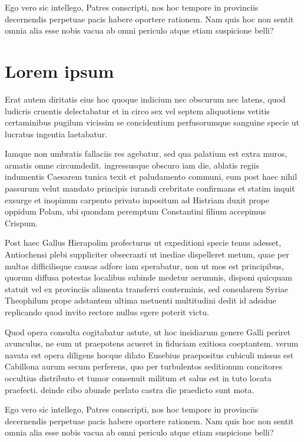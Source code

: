 ﻿\documentclass{SchoolReport}
\begin{document}
Ego vero sic intellego, Patres conscripti, nos hoc tempore in provinciis \citetext{{E}uropean {A}ssociation for {S}tandardizing {I}nformation and {C}ommunication {S}ystems ({ECMA}), \citeyear{ECMA-262-v6}} decernendis perpetuae pacis habere oportere rationem. Nam quis hoc non sentit omnia alia esse nobis vacua ab omni periculo atque etiam suspicione belli?


\appendix
\chapter{Lorem ipsum}
Erat autem diritatis eius hoc quoque indicium nec obscurum nec latens, quod ludicris cruentis delectabatur et in circo sex vel septem aliquotiens vetitis certaminibus pugilum vicissim se concidentium perfusorumque sanguine specie ut lucratus ingentia laetabatur.

Iamque non umbratis fallaciis res agebatur, sed qua palatium est extra muros, armatis omne circumdedit. ingressusque obscuro iam die, ablatis regiis indumentis Caesarem tunica texit et paludamento communi, eum post haec nihil passurum velut mandato principis iurandi crebritate confirmans et statim inquit exsurge et inopinum carpento privato inpositum ad Histriam duxit prope oppidum Polam, ubi quondam peremptum Constantini filium accepimus Crispum.

Post haec Gallus Hierapolim profecturus ut expeditioni specie tenus adesset, Antiochensi plebi suppliciter obsecranti ut inediae dispelleret metum, quae per multas difficilisque causas adfore iam sperabatur, non ut mos est principibus, quorum diffusa potestas localibus subinde medetur aerumnis, disponi quicquam statuit vel ex provinciis alimenta transferri conterminis, sed consularem Syriae Theophilum prope adstantem ultima metuenti multitudini dedit id adsidue replicando quod invito rectore nullus egere poterit victu.

Quod opera consulta cogitabatur astute, ut hoc insidiarum genere Galli periret avunculus, ne eum ut praepotens acueret in fiduciam exitiosa coeptantem. verum navata est opera diligens hocque dilato Eusebius praepositus cubiculi missus est Cabillona aurum secum perferens, quo per turbulentos seditionum concitores occultius distributo et tumor consenuit militum et salus est in tuto locata praefecti. deinde cibo abunde perlato castra die praedicto sunt mota.

Ego vero sic intellego, Patres conscripti, nos hoc tempore in provinciis \citetext{{ECMA}, \citeyear{ECMA-262-v6}} decernendis perpetuae pacis habere oportere rationem. Nam quis hoc non sentit omnia alia esse nobis vacua ab omni periculo atque etiam suspicione belli?


\end{document}
